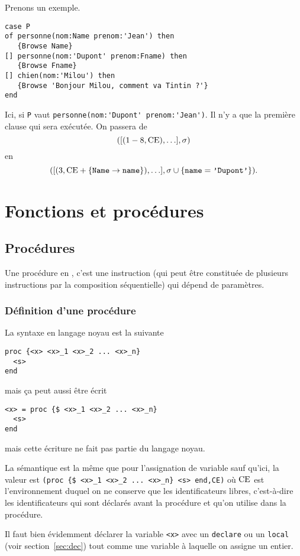 Prenons un exemple.
\begin{lstlisting}
case P
of personne(nom:Name prenom:'Jean') then
   {Browse Name}
[] personne(nom:'Dupont' prenom:Fname) then
   {Browse Fname}
[] chien(nom:'Milou') then
   {Browse 'Bonjour Milou, comment va Tintin ?'}
end
\end{lstlisting}
Ici, si \lstinline|P| vaut
\lstinline|personne(nom:'Dupont' prenom:'Jean')|.
Il n'y a que la première clause qui sera exécutée.
On passera de
\[ ([(1-8,\mathrm{CE}), \ldots], \sigma) \]
en
\[ ([(3,\ce+\{\verb|Name|\to\verb|name|\}), \ldots],
\sigma\cup\{\verb|name|=\verb|'Dupont'|\}). \]

\section{Fonctions et procédures}
\subsection{Procédures}
Une procédure en \oz{},
c'est une instruction
(qui peut être constituée de plusieurs instructions
par la composition séquentielle)
qui dépend de paramètres.

\subsubsection{Définition d'une procédure}
La syntaxe en langage noyau est la suivante
\begin{lstlisting}
proc {<x> <x>_1 <x>_2 ... <x>_n}
  <s>
end
\end{lstlisting}
mais ça peut aussi être écrit
\begin{lstlisting}
<x> = proc {$ <x>_1 <x>_2 ... <x>_n}
  <s>
end
\end{lstlisting}
mais cette écriture ne fait pas partie du langage noyau.

La sémantique est la même que pour l'assignation de variable sauf qu'ici,
la valeur est \lstinline|(proc {$ <x>_1 <x>_2 ... <x>_n} <s> end,CE)|
où $\mathrm{CE}$ est l'environnement duquel on ne conserve que les identificateurs
libres, c'est-à-dire les identificateurs qui sont déclarés avant la
procédure et qu'on utilise dans la procédure.

Il faut bien évidemment déclarer la variable \lstinline|<x>|
avec un \lstinline|declare| ou un \lstinline|local|
(voir section~\ref{sec:dec})
tout comme une variable à laquelle on assigne un entier.


